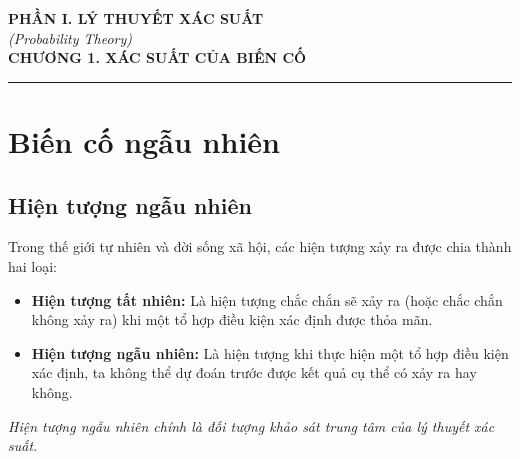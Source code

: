 \documentclass[12pt,a4paper]{article}
\theoremstyle{definition}
\begin{document}
\begin{center}
    {\large \textbf{PHẦN I. LÝ THUYẾT XÁC SUẤT}}\\[0.3em]
    {\normalsize \textit{(Probability Theory)}}\\[1em]
    {\LARGE \textbf{CHƯƠNG 1. XÁC SUẤT CỦA BIẾN CỐ}}
\end{center}

\vspace{1em}
\hrule
\vspace{1.5em}

\section{Biến cố ngẫu nhiên}

\subsection{Hiện tượng ngẫu nhiên}
Trong thế giới tự nhiên và đời sống xã hội, các hiện tượng xảy ra được chia thành hai loại:
\begin{itemize}[leftmargin=1.5em]
    \item \textbf{Hiện tượng tất nhiên:} Là hiện tượng chắc chắn sẽ xảy ra (hoặc chắc chắn không xảy ra) khi một tổ hợp điều kiện xác định được thỏa mãn.
    \item \textbf{Hiện tượng ngẫu nhiên:} Là hiện tượng khi thực hiện một tổ hợp điều kiện xác định, ta không thể dự đoán trước được kết quả cụ thể có xảy ra hay không.
\end{itemize}
\textit{Hiện tượng ngẫu nhiên chính là đối tượng khảo sát trung tâm của lý thuyết xác suất.}
\end{document}
